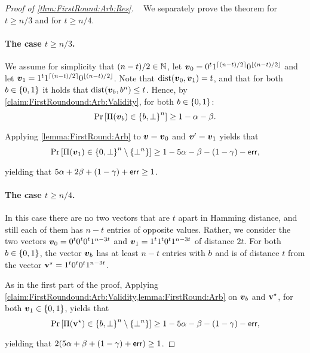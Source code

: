 \begin{proof}[Proof of \cref{thm:FirstRound:Arb:Res}]~
We separately prove the theorem  for $t \ge n/3$  and for $t \ge n/4$.

\paragraph{The case $t \ge n/3$.}
We assume for simplicity that $(n-t)/2\in {\mathbb{N}}$, let ${ \boldsymbol{v}}_0= 0^t 1^{\left\lceil (n-t)/2 \right\rceil} 0^{\left \lfloor(n-t)/2 \right \rfloor} $ and let ${ \boldsymbol{v}}_1 = 1^t 1^{\left\lceil (n-t)/2 \right\rceil} 0^{\left \lfloor(n-t)/2 \right \rfloor}$. Note that $\mathrm{dist}({ \boldsymbol{v}}_0,{ \boldsymbol{v}}_1) = t$, and that  for both $b\in \{0,1\}$ it holds that $\mathrm{dist}({ \boldsymbol{v}}_b,b^n)\le t$.  Hence, by \cref{claim:FirstRoundound:Arb:Validity},
for both $b\in \{0,1\}$:
\begin{align}
\Pr_{}\left[\Pi({ \boldsymbol{v}}_b) \in \left\{b,\bot\right\}^n\right] \ge 1 - \alpha - \beta.
\end{align}
Applying  \cref{lemma:FirstRound:Arb}  to ${ \boldsymbol{v}}= { \boldsymbol{v}}_0$ and ${ \boldsymbol{v}}'= { \boldsymbol{v}}_1$ yields that
	\begin{align*}
\Pr_{}\left[\Pi({ \boldsymbol{v}}_1) \in \left\{0,\perp\right\}^n \setminus \left\{\bot^n\right\}\right] \ge 1 - 5\alpha - \beta - (1- \gamma) - \mathsf{err},
\end{align*}
yielding that  $5\alpha + 2\beta + (1-\gamma)  + \mathsf{err}\ge 1$.

\paragraph{The case $t \ge n/4$.}  In this case there are no two vectors that are $t$ apart in Hamming distance, and still each of them has $n-t$ entries of opposite values. Rather, we consider the two vectors ${ \boldsymbol{v}}_0= 0^t 0^t 0^t 1^{n-3t}$ and  ${ \boldsymbol{v}}_1= 1^t 1^t 0^t 1^{n-3t}$ of distance $2t$. For both $b\in \{0,1\}$, the vector ${ \boldsymbol{v}}_b$ has at least $n-t$ entries with $b$ and is of distance $t$ from the vector $\mathbf{v}^{\star} =1^t 0^t 0^t  1^{n-3t}$.

As in the first part of the proof, Applying  \cref{claim:FirstRoundound:Arb:Validity,lemma:FirstRound:Arb}  on ${ \boldsymbol{v}}_b$ and $\mathbf{v}^{\star}$, for both ${ \boldsymbol{v}}_1\in \{0,1\}$, yields that
\begin{align*}
\Pr_{}\left[\Pi(\mathbf{v}^{\star}) \in \left\{b,\bot\right\}^n \setminus \left\{\bot^n\right\}\right] \ge 1 - 5\alpha - \beta - (1- \gamma) - \mathsf{err},
\end{align*}
yielding that $2(5\alpha + \beta + (1- \gamma) + \mathsf{err})  \ge 1$.
\end{proof}
	
